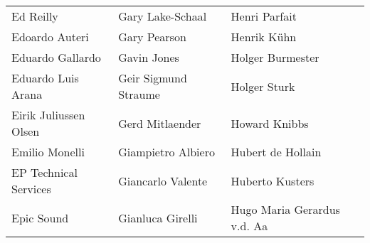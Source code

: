 \begin{tabular}{p{4.5cm}p{4.5cm}p{4.5cm}}
Ed Reilly & Gary Lake-Schaal & Henri Parfait \\
Edoardo Auteri & Gary Pearson & Henrik Kühn \\
Eduardo Gallardo & Gavin Jones & Holger Burmester \\
Eduardo Luis Arana & Geir Sigmund Straume & Holger Sturk \\
Eirik Juliussen Olsen & Gerd Mitlaender & Howard Knibbs \\
Emilio Monelli & Giampietro Albiero & Hubert de Hollain \\
EP Technical Services & Giancarlo Valente & Huberto Kusters \\
Epic Sound & Gianluca Girelli & Hugo Maria Gerardus v.d. Aa \\
\end{tabular}
\newpage
\setlength{\tabcolsep}{1mm}
